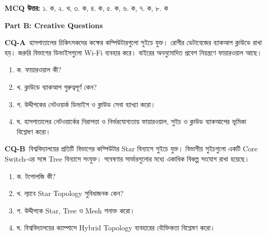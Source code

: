 \textbf{MCQ উত্তর:}
১. ক, ২. খ, ৩. ক, ৪. ক, ৫. ক, ৬. ক, ৭. ক, ৮. ক

\smallskip

\textbf{Part B: Creative Questions}

\textbf{CQ-A}\
হাসপাতালের চিকিৎসকদের কক্ষের কম্পিউটারগুলো সুইচে যুক্ত। রোগীর ডেটাবেজের ব্যাকআপ ক্লাউডে রাখা হয়। জরুরি বিভাগের ডিভাইসগুলো Wi-Fi ব্যবহার করে। বাইরের অননুমোদিত প্রবেশ নিয়ন্ত্রণে ফায়ারওয়াল আছে।

\begin{enumerate}
\item ক. ফায়ারওয়াল কী?
\item খ. ক্লাউডে ব্যাকআপ গুরুত্বপূর্ণ কেন?
\item গ. উদ্দীপকের নেটওয়ার্ক ডিভাইস ও ক্লাউড সেবা ব্যাখ্যা করো।
\item ঘ. হাসপাতালের নেটওয়ার্কের নিরাপত্তা ও নির্ভরযোগ্যতায় ফায়ারওয়াল, সুইচ ও ক্লাউড ব্যাকআপের ভূমিকা বিশ্লেষণ করো।
\end{enumerate}


\textbf{CQ-B}\
বিশ্ববিদ্যালয়ের প্রতিটি বিভাগের কম্পিউটার Star বিন্যাসে সুইচে যুক্ত। বিভাগীয় সুইচগুলো একটি Core Switch-এর সঙ্গে Tree বিন্যাসে সংযুক্ত। গবেষণার সার্ভারগুলোর মধ্যে একাধিক বিকল্প সংযোগ রাখা হয়েছে।

\begin{enumerate}
\item ক. টপোলজি কী?
\item খ. ল্যাবে Star Topology সুবিধাজনক কেন?
\item গ. উদ্দীপকে Star, Tree ও Mesh শনাক্ত করো।
\item ঘ. বিশ্ববিদ্যালয়ের ক্যাম্পাসে Hybrid Topology ব্যবহারের যৌক্তিকতা বিশ্লেষণ করো।
\end{enumerate}
\par







